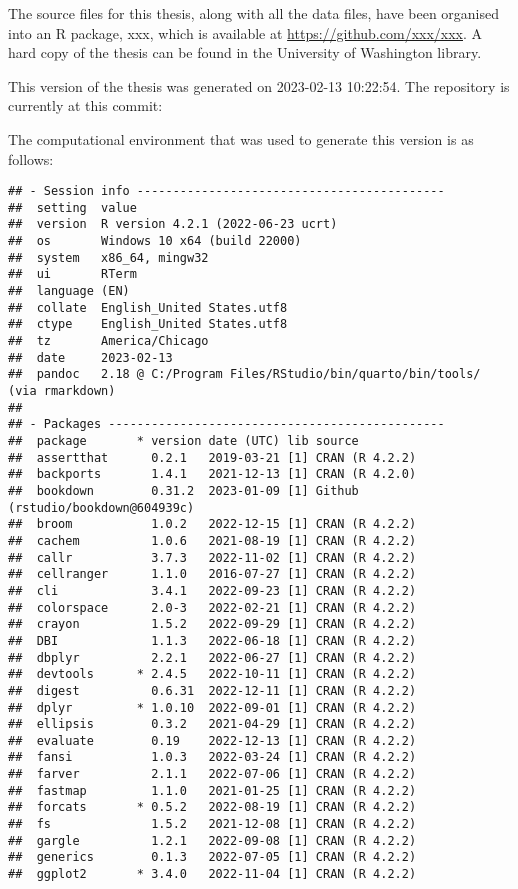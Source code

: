\documentclass[print]{nuthesis}
\begin{document}
The source files for this thesis, along with all the data files, have been organised into an R package, xxx, which is available at \url{https://github.com/xxx/xxx}. A hard copy of the thesis can be found in the University of Washington library.

This version of the thesis was generated on 2023-02-13 10:22:54. The repository is currently at this commit:

The computational environment that was used to generate this version is as follows:

\begin{verbatim}
## - Session info -------------------------------------------
##  setting  value
##  version  R version 4.2.1 (2022-06-23 ucrt)
##  os       Windows 10 x64 (build 22000)
##  system   x86_64, mingw32
##  ui       RTerm
##  language (EN)
##  collate  English_United States.utf8
##  ctype    English_United States.utf8
##  tz       America/Chicago
##  date     2023-02-13
##  pandoc   2.18 @ C:/Program Files/RStudio/bin/quarto/bin/tools/ (via rmarkdown)
## 
## - Packages -----------------------------------------------
##  package       * version date (UTC) lib source
##  assertthat      0.2.1   2019-03-21 [1] CRAN (R 4.2.2)
##  backports       1.4.1   2021-12-13 [1] CRAN (R 4.2.0)
##  bookdown        0.31.2  2023-01-09 [1] Github (rstudio/bookdown@604939c)
##  broom           1.0.2   2022-12-15 [1] CRAN (R 4.2.2)
##  cachem          1.0.6   2021-08-19 [1] CRAN (R 4.2.2)
##  callr           3.7.3   2022-11-02 [1] CRAN (R 4.2.2)
##  cellranger      1.1.0   2016-07-27 [1] CRAN (R 4.2.2)
##  cli             3.4.1   2022-09-23 [1] CRAN (R 4.2.2)
##  colorspace      2.0-3   2022-02-21 [1] CRAN (R 4.2.2)
##  crayon          1.5.2   2022-09-29 [1] CRAN (R 4.2.2)
##  DBI             1.1.3   2022-06-18 [1] CRAN (R 4.2.2)
##  dbplyr          2.2.1   2022-06-27 [1] CRAN (R 4.2.2)
##  devtools      * 2.4.5   2022-10-11 [1] CRAN (R 4.2.2)
##  digest          0.6.31  2022-12-11 [1] CRAN (R 4.2.2)
##  dplyr         * 1.0.10  2022-09-01 [1] CRAN (R 4.2.2)
##  ellipsis        0.3.2   2021-04-29 [1] CRAN (R 4.2.2)
##  evaluate        0.19    2022-12-13 [1] CRAN (R 4.2.2)
##  fansi           1.0.3   2022-03-24 [1] CRAN (R 4.2.2)
##  farver          2.1.1   2022-07-06 [1] CRAN (R 4.2.2)
##  fastmap         1.1.0   2021-01-25 [1] CRAN (R 4.2.2)
##  forcats       * 0.5.2   2022-08-19 [1] CRAN (R 4.2.2)
##  fs              1.5.2   2021-12-08 [1] CRAN (R 4.2.2)
##  gargle          1.2.1   2022-09-08 [1] CRAN (R 4.2.2)
##  generics        0.1.3   2022-07-05 [1] CRAN (R 4.2.2)
##  ggplot2       * 3.4.0   2022-11-04 [1] CRAN (R 4.2.2)

\end{verbatim}
\end{document}

